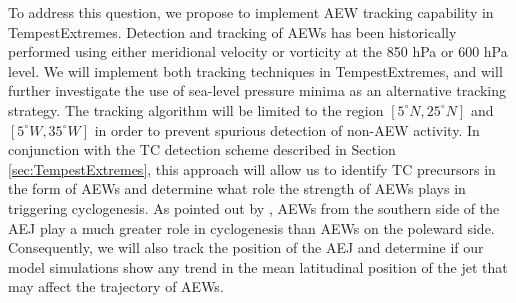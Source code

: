\documentclass[11pt]{article}
\begin{document}
To address this question, we propose to implement AEW tracking capability in TempestExtremes.  Detection and tracking of AEWs has been historically performed using either meridional velocity \citep{Burpee1974, Reed1977} or vorticity \citep{hodges1995feature, thorncroft2001african} at the 850 hPa or 600 hPa level.  We will implement both tracking techniques in TempestExtremes, and will further investigate the use of sea-level pressure minima as an alternative tracking strategy.  The tracking algorithm will be limited to the region $[5^\circ N, 25^\circ N]$ and $[5^\circ W, 35^\circ W]$ in order to prevent spurious detection of non-AEW activity.  In conjunction with the TC detection scheme described in Section \ref{sec:TempestExtremes}, this approach will allow us to identify TC precursors in the form of AEWs and determine what role the strength of AEWs plays in triggering cyclogenesis.  As pointed out by \cite{thorncroft2001african}, AEWs from the southern side of the AEJ play a much greater role in cyclogenesis than AEWs on the poleward side.  Consequently, we will also track the position of the AEJ and determine if our model simulations show any trend in the mean latitudinal position of the jet that may affect the trajectory of AEWs.






\end{document}
